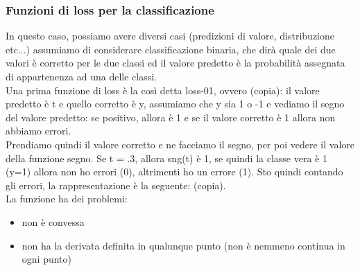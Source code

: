\documentclass[12pt, oneside]{extbook}
\begin{document}
\subsubsection{Funzioni di loss per la classificazione}
In questo caso, possiamo avere diversi casi (predizioni di valore, distribuzione etc...) assumiamo di considerare classificazione binaria, che dirà quale dei due valori è corretto per le due classi ed il valore predetto è la probabilità assegnata di appartenenza ad una delle classi.\\Una prima funzione di loss è la così detta loss-01, ovvero (copia): il valore predetto è t e quello corretto è y, assumiamo che y sia 1 o -1 e vediamo il segno del valore predetto: se positivo, allora è 1 e se il valore corretto è 1 allora non abbiamo errori.\\Prendiamo quindi il valore corretto e ne facciamo il segno, per poi vedere il valore della funzione segno. Se t = .3, allora sng(t) è 1, se quindi la classe vera è 1 (y=1) allora non ho errori (0), altrimenti ho un errore (1). Sto quindi contando gli errori, la rappresentazione è la seguente: (copia).\\La funzione ha dei problemi:
\begin{itemize}
	\item non è convessa
	\item non ha la derivata definita in qualunque punto (non è nemmeno continua in ogni punto)
\end{itemize}
\end{document}
